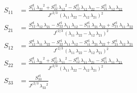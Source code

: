 \begin{align}
S_{11} &= \frac{S_{11}^{\mathrm{el}}\,{\lambda _{22}}^2+S_{22}^{\mathrm{el}}\,{\lambda _{12}}^2-S_{12}^{\mathrm{el}}\,\lambda _{12}\,\lambda _{22}-S_{21}^{\mathrm{el}}\,\lambda _{12}\,\lambda _{22}}{{J^{c}}^{2/3}\,{\left(\lambda _{11}\,\lambda _{22}-\lambda _{12}\,\lambda _{21}\right)}^2} \\ 
S_{21} &= \frac{S_{12}^{\mathrm{el}}\,\lambda _{12}\,\lambda _{21}-S_{22}^{\mathrm{el}}\,\lambda _{11}\,\lambda _{12}-S_{11}^{\mathrm{el}}\,\lambda _{21}\,\lambda _{22}+S_{21}^{\mathrm{el}}\,\lambda _{11}\,\lambda _{22}}{{J^{c}}^{2/3}\,{\left(\lambda _{11}\,\lambda _{22}-\lambda _{12}\,\lambda _{21}\right)}^2} \\ 
S_{12} &= \frac{S_{12}^{\mathrm{el}}\,\lambda _{11}\,\lambda _{22}-S_{22}^{\mathrm{el}}\,\lambda _{11}\,\lambda _{12}-S_{11}^{\mathrm{el}}\,\lambda _{21}\,\lambda _{22}+S_{21}^{\mathrm{el}}\,\lambda _{12}\,\lambda _{21}}{{J^{c}}^{2/3}\,{\left(\lambda _{11}\,\lambda _{22}-\lambda _{12}\,\lambda _{21}\right)}^2} \\ 
S_{22} &= \frac{S_{11}^{\mathrm{el}}\,{\lambda _{21}}^2+S_{22}^{\mathrm{el}}\,{\lambda _{11}}^2-S_{12}^{\mathrm{el}}\,\lambda _{11}\,\lambda _{21}-S_{21}^{\mathrm{el}}\,\lambda _{11}\,\lambda _{21}}{{J^{c}}^{2/3}\,{\left(\lambda _{11}\,\lambda _{22}-\lambda _{12}\,\lambda _{21}\right)}^2} \\ 
S_{33} &= \frac{S_{33}^{\mathrm{el}}}{{J^{c}}^{2/3}\,{\lambda _{33}}^2} 
\end{align}
